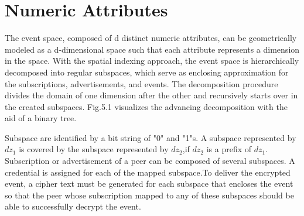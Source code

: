 \documentclass[MTech]{iitmdiss}
\begin{document}
\section{Numeric Attributes}
The event space, composed of d distinct numeric attributes,
can be geometrically modeled as a d-dimensional space
such that each attribute represents a dimension in the space.
With the spatial indexing approach, the event space is
hierarchically decomposed into regular subspaces, which
serve as enclosing approximation for the subscriptions,
advertisements, and events. The decomposition procedure
divides the domain of one dimension after the other and
recursively starts over in the created subspaces. Fig.5.1
visualizes the advancing decomposition with the aid of a
binary tree.

Subspace are identified by a bit string of "0" and "1"s. A
subspace represented by $dz_1$ is covered by the subspace
represented by $dz_2$,if $dz_2$ is a prefix of $dz_1$. Subscription or
advertisement of a peer can be composed of several
subspaces. A credential is assigned for each of the mapped
subspace.To deliver the encrypted event, a
cipher text must be generated for each subspace that
encloses the event so that the peer whose subscription
mapped to any of these subspaces should be able to
successfully decrypt the event.
\end{document}
